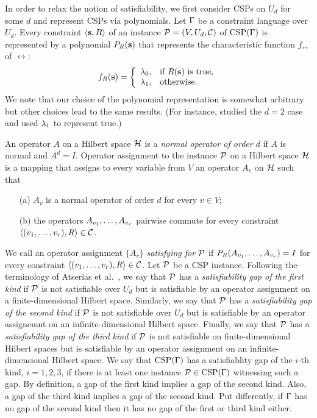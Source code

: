 In order to relax the notion of satisfiability, we first consider CSPs on $U_d$
for some $d$ and represent CSPs via polynomials. Let $\Gamma$ be a constraint 
language over $U_d$. Every constraint $\langle {\bf s},R \rangle$ of an instance 
${\mathcal P}=(V,U_d,{\mathcal C})$ of ${\rm CSP}(\Gamma)$ is represented by a polynomial 
$P_R({\bf s})$ that represents the characteristic function $f_\rel$ of
$\rel$:
%
\[
f_R({\bf s})=\left\{\begin{array}{ll}
  \lambda_0, & \text{if $R({\bf s})$ is true,}\\
  \lambda_1, & \text{otherwise}.
\end{array}\right.
\]
%
We note that our choice of the polynomial representation is somewhat arbitrary
but other choices lead to the same results. (For instance, \cite{AKS19:jcss}
studied the $d=2$ case and used $\lambda_1$ to represent true.) 

An operator $A$ on a Hilbert space ${\mathcal H}$ is a \emph{normal operator of order
$d$} if $A$ is normal and $A^d=I$. Operator assignment to the instance ${\mathcal P}$ on a Hilbert space ${\mathcal H}$ is a mapping 
that assigns to every variable from $V$ an operator $A_v$ on ${\mathcal H}$ such that
\begin{itemize}
\item[(a)]
$A_v$ is a normal operator of order $d$ for every $v\in V$;
\item[(b)]
the operators $A_{v_1},\ldots, A_{v_r}$ pairwise commute
for every constraint  $\langle (v _1,\ldots, v _{r}),R \rangle\in{\mathcal C}$.
\end{itemize}

\noindent
We call an operator assignment $\{A_v\}$ \emph{satisfying for ${\mathcal P}$} if 
$P_R(A_{v_1},\ldots, A_{v_r})=I$ for every constraint $\langle (v _1,\ldots, v _{r}),R \rangle\in{\mathcal C}$.
%
Let ${\mathcal P}$ be a CSP instance. 
Following the terminology of Atserias et al.~\cite{AKS19:jcss}, we say that
${\mathcal P}$ has a \emph{satisfiability gap of the first kind} if ${\mathcal P}$ is not
satisfiable over $U_d$ but is satisfiable by an operator assignment on 
a finite-dimensional Hilbert space. Similarly, we say that 
${\mathcal P}$ has a \emph{satisfiability gap of the second kind} if ${\mathcal P}$ is not
satisfiable over $U_d$ but is satisfiable by an operator assignemnt on an
infinite-dimensional Hilbert space. Finally, we say that 
${\mathcal P}$ has a \emph{satisfiability gap of the third kind} if ${\mathcal P}$
is not satisfiable on finite-dimensional Hilbert spaces but is satisfiable by an
operator assignment on 
an infinite-dimensional Hilbert space.
%
We say that ${\rm CSP}(\Gamma)$ has a satisfiablity gap of the $i$-th
kind, $i=1,2,3$, if there is at least one instance ${\mathcal P}\in{\rm CSP}(\Gamma)$ witnessing
such a gap.
%
By definition, a gap of the first kind implies a gap of the second kind. Also, a
gap of the third kind implies a gap of the second kind. Put differently, if
$\Gamma$ has no gap of the second kind then it has no gap of the first or third
kind either.

